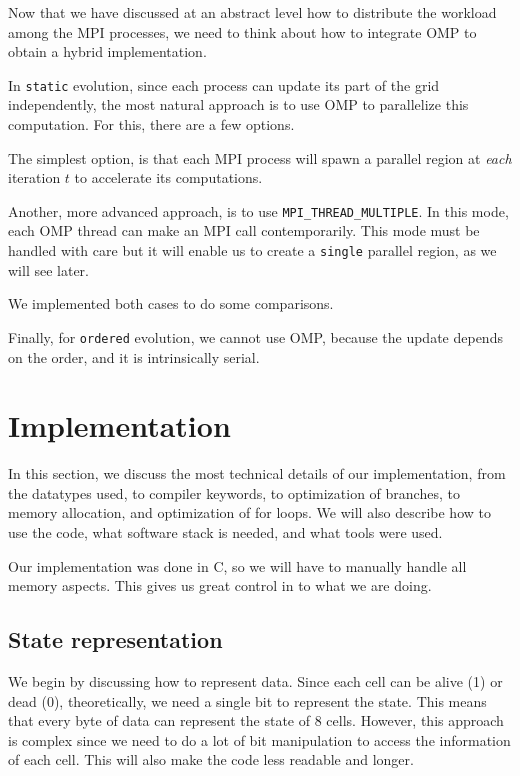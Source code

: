 \documentclass{report}
\begin{document}
Now that we have discussed at an abstract level how to distribute the workload 
among the MPI processes, we need to think about how to integrate OMP to obtain 
a hybrid implementation. 

In \texttt{static} evolution, since each process can update its part of the grid 
independently, the most natural approach is to use OMP to parallelize this 
computation. For this, there are a few options. 

The simplest option, is that each MPI process will spawn a parallel region at 
\textit{each} iteration $t$ to accelerate its computations.

Another, more advanced approach, is to use \texttt{MPI\_THREAD\_MULTIPLE}. In 
this mode, each OMP thread can make an MPI call contemporarily. This mode must 
be handled with care but it will enable us to create a \texttt{single} parallel
region, as we will see later. 

We implemented both cases to do some comparisons. 

Finally, for \texttt{ordered} evolution, we cannot use OMP, because the update 
depends on the order, and it is intrinsically serial.

\section{Implementation}

In this section, we discuss the most technical details of our implementation, 
from the datatypes used, to compiler keywords, to optimization of branches, to 
memory allocation, and optimization of for loops. We will also describe how to 
use the code, what software stack is needed, and what tools were used.

Our implementation was done in C, so we will have to manually handle all 
memory aspects. This gives us great control in to what we are doing. 

\subsection{State representation}

We begin by discussing how to represent data. Since each cell can be alive (1) 
or dead (0), theoretically, we need a single bit to represent the state. This 
means that every byte of data can represent the state of 8 cells. However, 
this approach is complex since we need to do a lot of bit manipulation to 
access the information of each cell. This will also make the code less 
readable and longer. 
\end{document}
